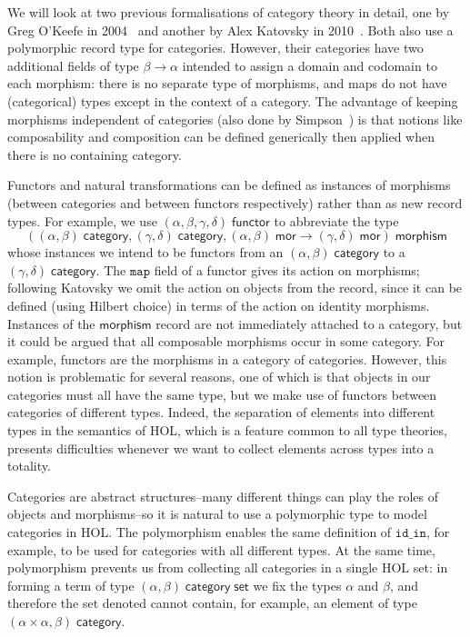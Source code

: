 \documentclass[twoside,titlepage,11pt]{article}
\begin{document}
We will look at two previous formalisations of category theory in detail, one by Greg O'Keefe in 2004~\cite{DBLP:journals/entcs/OKeefe04} and another by Alex Katovsky in 2010~\cite{Katovsky}.
Both also use a polymorphic record type for categories.
However, their categories have two additional fields of type $\beta\to\alpha$ intended to assign a domain and codomain to each morphism: there is no separate type of morphisms, and maps do not have (categorical) types except in the context of a category.
The advantage of keeping morphisms independent of categories (also done by Simpson~\cite{Simpson04}) is that notions like composability and composition can be defined generically then applied when there is no containing category.

Functors and natural transformations can be defined as instances of morphisms (between categories and between functors respectively) rather than as new record types.
For example, we use $(\alpha,\beta,\gamma,\delta)\;\mathsf{functor}$ to abbreviate the type \[((\alpha,\beta)\;\mathsf{category},(\gamma,\delta)\;\mathsf{category},(\alpha,\beta)\;\mathsf{mor}\to(\gamma,\delta)\;\mathsf{mor})\;\mathsf{morphism}\] whose instances we intend to be functors from an $(\alpha,\beta)\;\mathsf{category}$ to a $(\gamma,\delta)\;\mathsf{category}$.
The $\mathtt{map}$ field of a functor gives its action on morphisms; following Katovsky we omit the action on objects from the record, since it can be defined (using Hilbert choice) in terms of the action on identity morphisms.
Instances of the $\mathsf{morphism}$ record are not immediately attached to a category, but it could be argued that all composable morphisms occur in some category.
For example, functors are the morphisms in a category of categories.
However, this notion is problematic for several reasons, one of which is that objects in our categories must all have the same type, but we make use of functors between categories of different types.
Indeed, the separation of elements into different types in the semantics of HOL, which is a feature common to all type theories, presents difficulties whenever we want to collect elements across types into a totality.

Categories are abstract structures--many different things can play the roles of objects and morphisms--so it is natural to use a polymorphic type to model categories in HOL.
The polymorphism enables the same definition of $\mathtt{id\_in}$, for example, to be used for categories with all different types.
At the same time, polymorphism prevents us from collecting all categories in a single HOL set: in forming a term of type $(\alpha,\beta)\;\mathsf{category}\;\mathsf{set}$ we fix the types $\alpha$ and $\beta$, and therefore the set denoted cannot contain, for example, an element of type $(\alpha\times\alpha,\beta)\;\mathsf{category}$.
\end{document}
